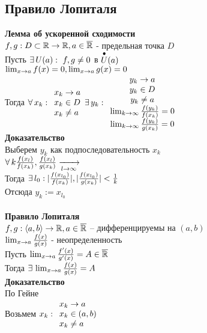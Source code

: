 \documentclass[12pt]{article}
\begin{document}
\subsection{Правило Лопиталя}
\textbf{Лемма об ускоренной сходимости}\\
$f, g: D \subset \mathbb{R} \rightarrow \mathbb{R}, a\in \overline{\mathbb{R}}$ - предельная точка $D$\\
Пусть $\exists\, U(a):\ f,g\neq 0$ в $\overset{\bullet}{U}(a)$\\
$\lim_{x\rightarrow a} f(x) = 0, \lim_{x\rightarrow a} g(x) = 0$\\
Тогда $\forall\, x_k: \begin{array}{l}
     x_k \rightarrow a\\
     x_k \in D\\
     x_k \neq a
\end{array} \exists\, y_k: \begin{array}{cc}
     y_k \rightarrow a\\
     y_k \in D\\
     y_k \neq a\\
     \lim_{k \rightarrow \infty} \frac{f(y_k)}{f(x_k)} = 0\\
     \lim_{k \rightarrow \infty} \frac{f(y_k)}{g(x_k)} = 0
\end{array}$\\
\textbf{Доказательство}\\
Выберем $y_k$ как подпоследовательность $x_k$\\
$\forall\, k \frac{f(x_l)}{f(x_k)},\frac{f(x_l)}{g(x_k)} \xrightarrow[l\rightarrow \infty]{}$\\
Тогда $\exists\, l_0: |\frac{f(x_{l_0})}{f(x_k)}|,|\frac{f(x_{l_0})}{g(x_k)}| < \frac1k$\\
Отсюда $y_k := x_{l_0}$\\\\
\textbf{Правило Лопиталя}\\
$f,g: \langle a, b \rangle \rightarrow \mathbb{R}, a \in \overline{\mathbb{R}}$ -- дифференцируемы на $(a,b)$\\
$\lim_{x\rightarrow a} \frac{f(x)}{g(x)}$ - неопределенность\\
Пусть $\lim_{x\rightarrow a}\frac{f'(x)}{g'(x)} = A \in \overline{\mathbb{R}}$\\
Тогда $\exists\, \lim_{x\rightarrow a} \frac{f(x)}{g(x)} = A$\\
\textbf{Доказательство}\\
По Гейне\\
Возьмем $x_k: \begin{array}{l}
     x_k \rightarrow a\\
     x_k \in (a, b)\\
     x_k \neq a
\end{array}$\\
\end{document}
